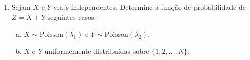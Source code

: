 \documentclass[../Notas.tex]{subfiles}
\begin{document}
\begin{enumerate}
\begin{proof}[Solução]
        \begin{enumerate}[a)]
            \item Se $z<0$, então $X>Y$, ou seja, $Y = w$ e $X = w-z$. Se $z\geq 0$,
            então $Y\geq X$, ou seja, $X = w$ e $Y = w+z$. Portanto,
            \[
            P(W=w, Z=z) = \begin{cases}
            P(X = w-z)P(Y=w), z < 0 \\
            P(X=w)P(Y = w+z), z\geq 0.
            \end{cases}
            \]
            \item Do item anterior,
            \begin{align*}
                P(W=w, Z=z) = \begin{cases}
                p^2(1-p)^{2(w-1)}(1-p)^{-z}, z < 0 \\
                p^2(1-p)^{2(w-1)}(1-p)^z, z\geq 0.
                \end{cases} = p^2(1-p)^{2(w-1)}(1-p)^{|z|}.
            \end{align*}
            \item Note que
            \begin{align*}
                p_Z(z) &= p^2(1-p)^{|z|-2}\sum_{w=1}^{\infty} (1-p)^{2w} \\
                       &= p^2(1-p)^{|z|-2}\frac{(1-p)^2}{1 - (1-p)^2}.
            \end{align*}
            Logo,
            \begin{align*}
                p_Z(z)p_W(w) &= p^2(1-p)^{|z|-2}\frac{(1-p)^2}{1-(1-p)^2}[1-(1-p)^2](1-p)^{2(w-1)} \\
                             &= p_{Z,W}(z,w)
            \end{align*}
            e, portanto, $Z$ e $W$ são independentes.
        \end{enumerate}
    \end{proof}
    \item Sejam $X$ e $Y$ v.a.’s independentes. Determine a função de probabilidade de $Z = X+Y$ seguintes casos:
    \begin{enumerate}[a)]
    \item $X\sim\text{Poisson}(\lambda_1)$ e $Y\sim\text{Poisson}(\lambda_2)$.
    \item $X$ e $Y$ uniformemente distribuídas sobre $\{1, 2, \dots, N\}$.
    \end{enumerate}

\end{enumerate}
\end{document}
